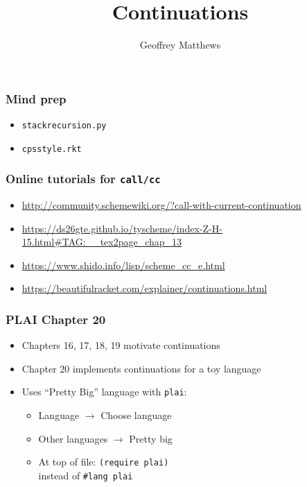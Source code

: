 \documentclass{beamer}
\title{Continuations}
\author{Geoffrey Matthews}
\newcommand{\bi}{\begin{itemize}}
\newcommand{\li}{\item}
\newcommand{\ei}{\end{itemize}}
\newcommand{\bfr}[1]{\begin{frame}[fragile]\frametitle{{ #1 }}}
\begin{document}
\begin{frame}
\maketitle
\end{frame}

\bfr{Mind prep}
\bi
\li {\tt stackrecursion.py}
\li {\tt cpsstyle.rkt}
\ei
\end{frame}

\bfr{Online tutorials for {\tt call/cc}}

\centerline{}

\bi
\li\url{http://community.schemewiki.org/?call-with-current-continuation}
\li\url{https://ds26gte.github.io/tyscheme/index-Z-H-15.html#TAG:__tex2page_chap_13}
\li\url{https://www.shido.info/lisp/scheme_cc_e.html}
\li\url{https://beautifulracket.com/explainer/continuations.html}
\ei
\end{frame}

\bfr{PLAI Chapter 20}
\bi
\li Chapters 16, 17, 18, 19 motivate continuations
\li Chapter 20 implements continuations for a toy language
\li Uses ``Pretty Big'' language with {\tt plai}:
\bi
\li Language $\rightarrow$ Choose language
\li Other languages $\rightarrow$ Pretty big
\li At top of file: {\tt (require plai)}\\
    instead of {\tt \#lang plai}
    \ei\ei
    

\end{frame}
\end{document}
